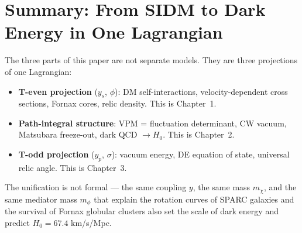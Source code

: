\section{Summary: From SIDM to Dark Energy in One Lagrangian}
\label{ch3:summary}

The three parts of this paper are not separate models. They are three
projections of one Lagrangian:

\begin{itemize}
  \item \textbf{T-even projection} ($y_s$, $\phi$): DM self-interactions,
        velocity-dependent cross sections, Fornax cores, relic density.
        This is Chapter~1.
  \item \textbf{Path-integral structure}: VPM = fluctuation determinant,
        CW vacuum, Matsubara freeze-out, dark QCD $\to H_0$.
        This is Chapter~2.
  \item \textbf{T-odd projection} ($y_p$, $\sigma$): vacuum energy, DE equation
        of state, universal relic angle. This is Chapter~3.
\end{itemize}

The unification is not formal — the same coupling $y$, the same mass $m_\chi$,
and the same mediator mass $m_\phi$ that explain the rotation curves of SPARC
galaxies and the survival of Fornax globular clusters also set the scale of
dark energy and predict $H_0 = 67.4$ km/s/Mpc.
